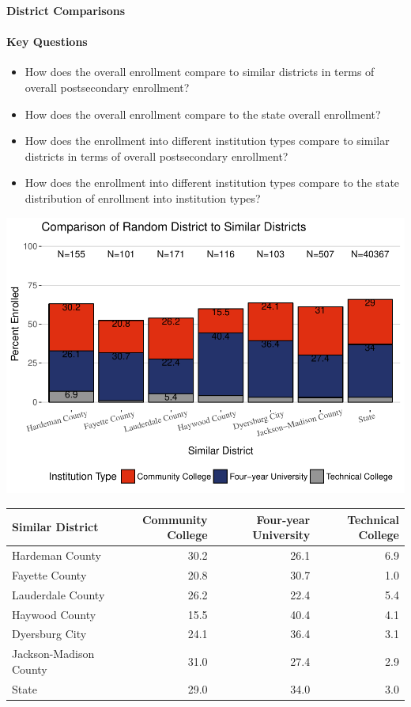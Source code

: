 \documentclass[11pt,]{article}
\providecommand{\tightlist}{%
  \setlength{\itemsep}{0pt}\setlength{\parskip}{0pt}}
\let\oldparagraph\paragraph
\renewcommand{\paragraph}[1]{\oldparagraph{#1}\mbox{}}
\begin{document}
\newpage

\textbf{District Comparisons}

\paragraph{Key Questions}\label{key-questions-1}

\begin{itemize}
\tightlist
\item
  How does the overall enrollment compare to similar districts in terms
  of overall postsecondary enrollment?
\item
  How does the overall enrollment compare to the state overall
  enrollment?
\item
  How does the enrollment into different institution types compare to
  similar districts in terms of overall postsecondary enrollment?
\item
  How does the enrollment into different institution types compare to
  the state distribution of enrollment into institution types?
\end{itemize}

\includegraphics{20170411_PSWRR_no_CTE_files/figure-latex/comparison_districts-1.pdf}

\begin{longtable}[]{@{}lrrr@{}}
\toprule
Similar District & Community College & Four-year University & Technical
College\tabularnewline
\midrule
\endhead
Hardeman County & 30.2 & 26.1 & 6.9\tabularnewline
Fayette County & 20.8 & 30.7 & 1.0\tabularnewline
Lauderdale County & 26.2 & 22.4 & 5.4\tabularnewline
Haywood County & 15.5 & 40.4 & 4.1\tabularnewline
Dyersburg City & 24.1 & 36.4 & 3.1\tabularnewline
Jackson-Madison County & 31.0 & 27.4 & 2.9\tabularnewline
State & 29.0 & 34.0 & 3.0\tabularnewline
\bottomrule
\end{longtable}
\end{document}
